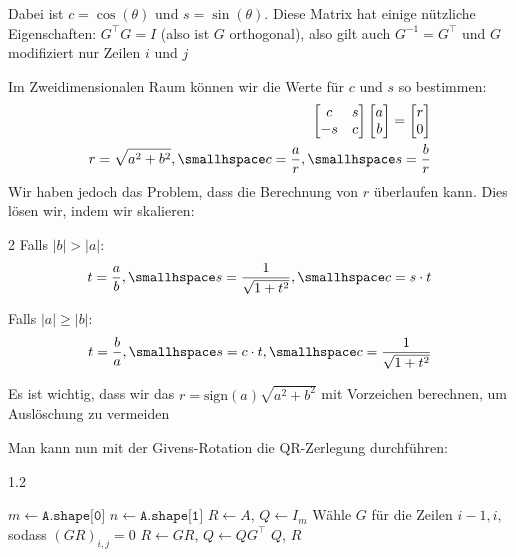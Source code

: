 \drmvspace
Dabei ist $c = \cos(\theta)$ und $s = \sin(\theta)$.
Diese Matrix hat einige nützliche Eigenschaften: $G^\top G = I$ (also ist $G$ orthogonal), also gilt auch $G^{-1} = G^\top$ und $G$ modifiziert nur Zeilen $i$ und $j$

Im Zweidimensionalen Raum können wir die Werte für $c$ und $s$ so bestimmen:
\rmvspace
\begin{align*}
    \begin{bmatrix}
        c  & s \\
        -s & c
    \end{bmatrix}
    \begin{bmatrix}
        a \\ b
    \end{bmatrix}
    =
    \begin{bmatrix}
        r \\ 0
    \end{bmatrix} \\
    r = \sqrt{a^2 + b^2}, \smallhspace c = \frac{a}{r}, \smallhspace s = \frac{b}{r}
\end{align*}
Wir haben jedoch das Problem, dass die Berechnung von $r$ überlaufen kann. Dies lösen wir, indem wir skalieren:
\drmvspace
\begin{multicols}{2}
    Falls $|b| > |a|$:
    \rmvspace
    \begin{align*}
        t = \frac{a}{b}, \smallhspace s = \frac{1}{\sqrt{1 + t^2}}, \smallhspace c = s \cdot t
    \end{align*}

    Falls $|a| \geq |b|$:
    \drmvspace
    \begin{align*}
        t = \frac{b}{a}, \smallhspace s = c \cdot t, \smallhspace c = \frac{1}{\sqrt{1 + t^2}}
    \end{align*}
\end{multicols}
Es ist wichtig, dass wir das $r = \text{sign}(a) \sqrt{a^2 + b^2}$ mit Vorzeichen berechnen, um Auslöschung zu vermeiden

Man kann nun mit der Givens-Rotation die QR-Zerlegung durchführen:
\begin{algorithm}
    \begin{spacing}{1.2}
        \caption{\textsc{GivensQRDecomposition}(A)}
        \begin{algorithmic}[1]
            \State $m \gets \texttt{A.shape[0]}$
            \State $n \gets \texttt{A.shape[1]}$
            \State $R \gets A$, $Q \gets I_m$
                    \State Wähle $G$ für die Zeilen $i-1,i$, sodass $(GR)_{i,j}=0$
                    \State $R \gets GR$, $Q \gets QG^\top$
                \EndFor
            \EndFor
            \State \Return $Q$, $R$
        \end{algorithmic}
    \end{spacing}
\end{algorithm}


